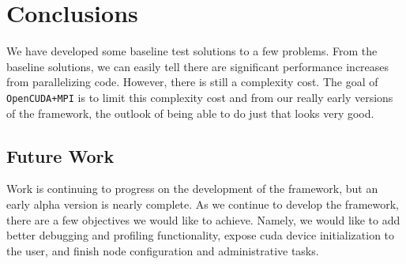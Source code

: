 \section{Conclusions}

We have developed some baseline test solutions to a few problems. From the
baseline solutions, we can easily tell there are significant performance
increases from parallelizing code. However, there is still a complexity cost.
The goal of \texttt{OpenCUDA+MPI} is to limit this complexity cost and from our
really early versions of the framework, the outlook of being able to do just
that looks very good.

\subsection{Future Work}

Work is continuing to progress on the development of the framework, but an
early alpha version is nearly complete. As we continue to develop the
framework, there are a few objectives we would like to achieve. Namely, we
would like to add better debugging and profiling functionality, expose
\gls{cuda} device initialization to the user, and finish node configuration and
administrative tasks.
